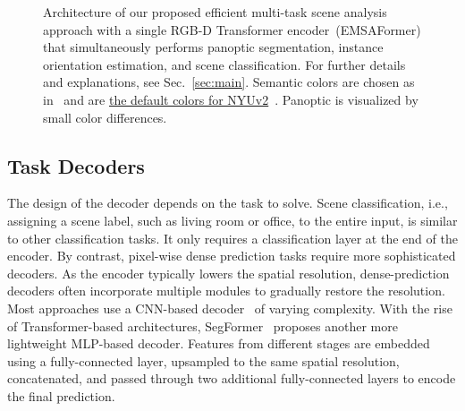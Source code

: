 \documentclass[conference]{IEEEtran}
\begin{document}
\begin{figure*}[!b]\centering \vspace{-6mm}\vspace{-3mm}\caption{Architecture of our proposed efficient multi-task scene analysis approach with a single RGB-D Transformer encoder~(EMSAFormer) that simultaneously performs panoptic segmentation, instance orientation estimation, and scene classification. For further details and explanations, see Sec.~\ref{sec:main}.
        Semantic colors are chosen as in~\cite{emsanet2022ijcnn} and are \href{https://github.com/TUI-NICR/nicr-scene-analysis-datasets/blob/v0.5.3/nicr_scene_analysis_datasets/datasets/nyuv2/nyuv2.py\#L193}{the default colors for NYUv2}~\cite{NYUv2-eccv2012}.
        Panoptic is visualized by small color differences.
    }\label{fig:architecture}\end{figure*}

\subsection{Task Decoders}
The design of the decoder depends on the task to solve.
Scene classification, i.e., assigning a scene label, such as living room or office, to the entire input, is similar to other classification tasks.
It only requires a classification layer at the end of the encoder.
By contrast, pixel-wise dense prediction tasks require more sophisticated decoders.
As the encoder typically lowers the spatial resolution, dense-prediction decoders often incorporate multiple modules to gradually restore the resolution.
Most approaches use a CNN-based decoder~\cite{PSPNet-cvpr2017, DeepLabv3-arxiv2017, DeepLabv3plus-eccv-2018, SwiftNet-cvpr2019, esanet2021icra} of varying complexity.
With the rise of Transformer-based architectures, SegFormer~\cite{SegFromer-neurips2021} proposes another more lightweight MLP-based decoder.
Features from different stages are embedded using a fully-connected layer, upsampled to the same spatial resolution, concatenated, and passed through two additional fully-connected layers to encode the final prediction.
\end{document}
